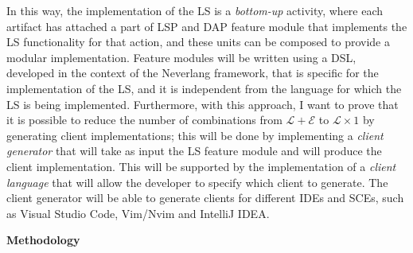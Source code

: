 In this way, the implementation of the LS is a \textit{bottom-up} activity, where each artifact has attached a part of LSP and DAP feature module that implements the LS functionality for that action, and these units can be composed to provide a modular implementation.
Feature modules will be written using a DSL, developed in the context of the Neverlang framework, that is specific for the implementation of the LS, and it is independent from the language for which the LS is being implemented.
Furthermore, with this approach, I want to prove that it is possible to reduce the number of combinations from $\mathcal{L} + \mathcal{E}$ to $\mathcal{L} \times 1$ by generating client implementations; this will be done by implementing a \textit{client generator} that will take as input the LS feature module and will produce the client implementation. This will be supported by the implementation of a \textit{client language} that will allow the developer to specify which client to generate. The client generator will be able to generate clients for different IDEs and SCEs, such as Visual Studio Code, Vim/Nvim and IntelliJ IDEA.

\hfill \break
\noindent
\textbf{Methodology}

